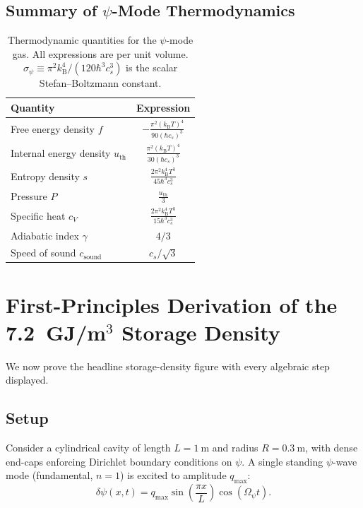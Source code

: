 \documentclass[aps,prd,twocolumn,showpacs,preprintnumbers,superscriptaddress,nofootinbib]{revtex4-2}
\newcommand{\kB}{k_{\mathrm{B}}}
\newcommand{\Opsi}{\Omega_\psi}
\begin{document}
\subsection{Summary of $\psi$-Mode Thermodynamics}\label{sec:thermo-summary}

\begin{table}[h]
\caption{Thermodynamic quantities for the $\psi$-mode gas.  All
expressions are per unit volume.  $\sigma_\psi \equiv \pi^2\kB^4/(120\hbar^3 c_s^3)$ is the scalar Stefan--Boltzmann constant.}
\label{tab:thermo}
\begin{ruledtabular}
\begin{tabular}{lc}
Quantity & Expression \\
\hline
Free energy density $f$ & $-\frac{\pi^2(\kB T)^4}{90(\hbar c_s)^3}$ \\[6pt]
Internal energy density $u_{\mathrm{th}}$ & $\frac{\pi^2(\kB T)^4}{30(\hbar c_s)^3}$ \\[6pt]
Entropy density $s$ & $\frac{2\pi^2\kB^4 T^3}{45\hbar^3 c_s^3}$ \\[6pt]
Pressure $P$ & $\frac{u_{\mathrm{th}}}{3}$ \\[6pt]
Specific heat $c_V$ & $\frac{2\pi^2\kB^4 T^3}{15\hbar^3 c_s^3}$ \\[6pt]
Adiabatic index $\gamma$ & $4/3$ \\[4pt]
Speed of sound $c_{\mathrm{sound}}$ & $c_s/\sqrt{3}$ \\
\end{tabular}
\end{ruledtabular}
\end{table}

\section{First-Principles Derivation of the 7.2~GJ/m$^3$ Storage Density}\label{sec:72GJ}

We now prove the headline storage-density figure with every algebraic
step displayed.

\subsection{Setup}\label{sec:setup72}

Consider a cylindrical cavity of length $L = 1~\mathrm{m}$ and radius
$R = 0.3~\mathrm{m}$, with dense end-caps enforcing Dirichlet boundary
conditions on $\psi$.  A single standing $\psi$-wave mode (fundamental,
$n = 1$) is excited to amplitude $q_{\max}$:
\begin{equation}\label{eq:psi-mode}
\delta\psi(x,t) = q_{\max}\sin\!\left(\frac{\pi x}{L}\right)
  \cos(\Opsi t).
\end{equation}
\end{document}

